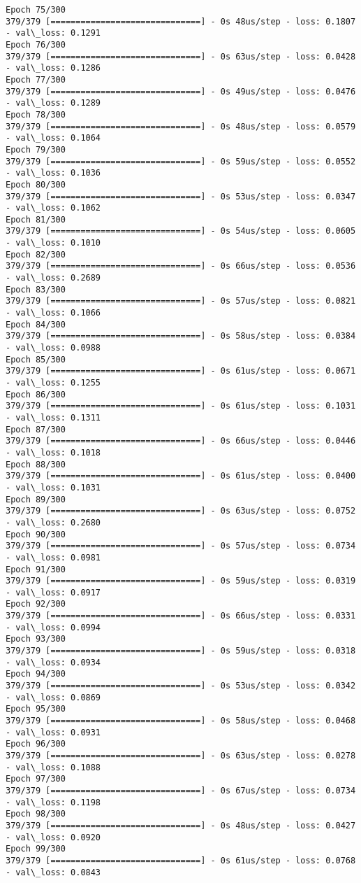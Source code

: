 \documentclass[11pt]{article}
\begin{document}
\begin{Verbatim}[commandchars=\\\{\}]
Epoch 75/300
379/379 [==============================] - 0s 48us/step - loss: 0.1807 - val\_loss: 0.1291
Epoch 76/300
379/379 [==============================] - 0s 63us/step - loss: 0.0428 - val\_loss: 0.1286
Epoch 77/300
379/379 [==============================] - 0s 49us/step - loss: 0.0476 - val\_loss: 0.1289
Epoch 78/300
379/379 [==============================] - 0s 48us/step - loss: 0.0579 - val\_loss: 0.1064
Epoch 79/300
379/379 [==============================] - 0s 59us/step - loss: 0.0552 - val\_loss: 0.1036
Epoch 80/300
379/379 [==============================] - 0s 53us/step - loss: 0.0347 - val\_loss: 0.1062
Epoch 81/300
379/379 [==============================] - 0s 54us/step - loss: 0.0605 - val\_loss: 0.1010
Epoch 82/300
379/379 [==============================] - 0s 66us/step - loss: 0.0536 - val\_loss: 0.2689
Epoch 83/300
379/379 [==============================] - 0s 57us/step - loss: 0.0821 - val\_loss: 0.1066
Epoch 84/300
379/379 [==============================] - 0s 58us/step - loss: 0.0384 - val\_loss: 0.0988
Epoch 85/300
379/379 [==============================] - 0s 61us/step - loss: 0.0671 - val\_loss: 0.1255
Epoch 86/300
379/379 [==============================] - 0s 61us/step - loss: 0.1031 - val\_loss: 0.1311
Epoch 87/300
379/379 [==============================] - 0s 66us/step - loss: 0.0446 - val\_loss: 0.1018
Epoch 88/300
379/379 [==============================] - 0s 61us/step - loss: 0.0400 - val\_loss: 0.1031
Epoch 89/300
379/379 [==============================] - 0s 63us/step - loss: 0.0752 - val\_loss: 0.2680
Epoch 90/300
379/379 [==============================] - 0s 57us/step - loss: 0.0734 - val\_loss: 0.0981
Epoch 91/300
379/379 [==============================] - 0s 59us/step - loss: 0.0319 - val\_loss: 0.0917
Epoch 92/300
379/379 [==============================] - 0s 66us/step - loss: 0.0331 - val\_loss: 0.0994
Epoch 93/300
379/379 [==============================] - 0s 59us/step - loss: 0.0318 - val\_loss: 0.0934
Epoch 94/300
379/379 [==============================] - 0s 53us/step - loss: 0.0342 - val\_loss: 0.0869
Epoch 95/300
379/379 [==============================] - 0s 58us/step - loss: 0.0468 - val\_loss: 0.0931
Epoch 96/300
379/379 [==============================] - 0s 63us/step - loss: 0.0278 - val\_loss: 0.1088
Epoch 97/300
379/379 [==============================] - 0s 67us/step - loss: 0.0734 - val\_loss: 0.1198
Epoch 98/300
379/379 [==============================] - 0s 48us/step - loss: 0.0427 - val\_loss: 0.0920
Epoch 99/300
379/379 [==============================] - 0s 61us/step - loss: 0.0768 - val\_loss: 0.0843

\end{Verbatim}
\end{document}
